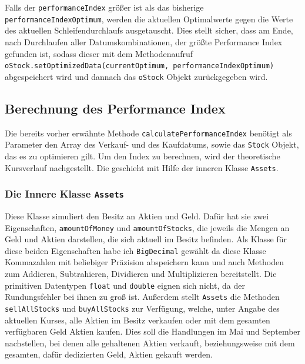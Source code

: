 \documentclass[12pt, a4paper, titlepage]{report}
\begin{document}
            Falls der \texttt{performanceIndex} größer ist als das bisherige
            \texttt{performanceIndexOptimum}, werden die aktuellen Optimalwerte
            gegen die Werte des aktuellen Schleifendurchlaufs ausgetauscht. Dies
            stellt sicher, dass am Ende, nach Durchlaufen aller Datumskombinationen,
            der größte Performance Index gefunden ist, sodass dieser mit dem
            Methodenaufruf \texttt{oStock.setOptimi\allowbreak zedData(currentOptimum,
            performanceIndexOptimum)} abgespeichert wird und dannach das
            \texttt{oStock} Objekt zurückgegeben wird.
            
            \subsection{Berechnung des Performance Index}
            Die bereits vorher erwähnte Methode \texttt{calculatePerformanceIndex}
            benötigt als Parameter den Array des Verkauf- und des Kaufdatums, sowie
            das \texttt{Stock} Objekt, das es zu optimieren gilt. Um den Index zu berechnen,
            wird der theoretische Kursverlauf nachgestellt. Die geschieht mit Hilfe der
            inneren Klasse \texttt{Assets}.  
            
            \subsubsection{Die Innere Klasse \texttt{Assets}}
            Diese Klasse simuliert den Besitz an Aktien und Geld. Dafür hat sie zwei
            Eigenschaften, \texttt{amountOfMoney} und
            \texttt{amountOfStocks}, die jeweils die Mengen an Geld und Aktien
            darstellen, die sich aktuell im Besitz befinden. Als Klasse für diese beiden
            Eigenschaften habe ich \texttt{BigDecimal} gewählt da diese Klasse Kommazahlen
            mit beliebiger Präzision abspeichern kann und auch Methoden zum Addieren,
            Subtrahieren, Dividieren und Multiplizieren bereitstellt. Die primitiven
            Datentypen \texttt{float} und \texttt{double} eignen sich nicht, da der
            Rundungsfehler bei ihnen zu groß ist.
            Außerdem stellt \texttt{Assets} die Methoden \texttt{sellAllStocks} und
            \texttt{buyAllStocks} zur Verfügung, welche, unter Angabe des aktuellen
            Kurses, alle Aktien im Besitz verkaufen oder mit dem gesamten verfügbaren
            Geld Aktien kaufen. Dies soll die Handlungen
            im Mai und September nachstellen, bei denen alle gehaltenen Aktien verkauft,
            beziehungsweise mit dem gesamten, dafür dedizierten Geld, Aktien gekauft werden.
            
\end{document}
